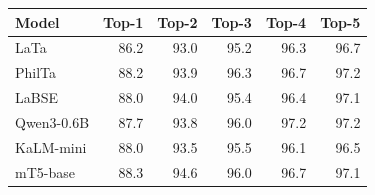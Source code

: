 \begin{tabular}{lrrrrr}
\toprule
\textbf{Model} & \textbf{Top-1} & \textbf{Top-2} & \textbf{Top-3} & \textbf{Top-4} & \textbf{Top-5} \\
\midrule
LaTa & 86.2 & 93.0 & 95.2 & 96.3 & 96.7 \\
PhilTa & 88.2 & 93.9 & 96.3 & 96.7 & 97.2 \\
LaBSE & 88.0 & 94.0 & 95.4 & 96.4 & 97.1 \\
Qwen3-0.6B & 87.7 & 93.8 & 96.0 & 97.2 & 97.2 \\
KaLM-mini & 88.0 & 93.5 & 95.5 & 96.1 & 96.5 \\
mT5-base & 88.3 & 94.6 & 96.0 & 96.7 & 97.1 \\
\bottomrule
\end{tabular}
